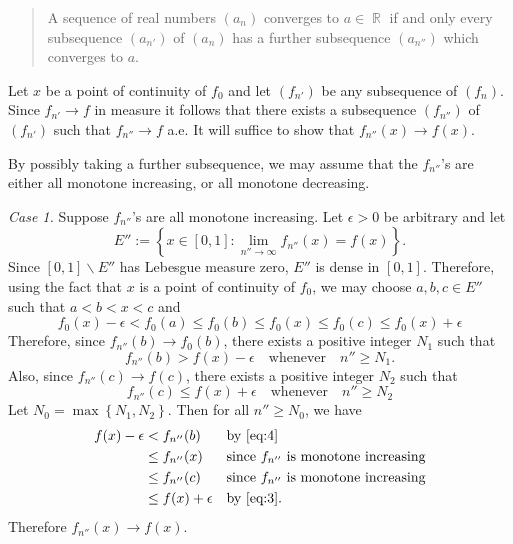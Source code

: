\documentclass[answers]{exam}
\DeclareMathOperator{\RR}{\mathbb{R}}
\begin{document}
\begin{questions}
\begin{solution}
\begin{quote}
  A sequence of real numbers $(a_{n})$ converges
  to $a\in \RR$ if and only every subsequence $(a_{n'})$ of $(a_{n})$ has a
  further subsequence $(a_{n''})$ which converges to $a$.
\end{quote}


Let $x$ be a point of continuity of $f_{0}$ and let $(f_{n'})$ be any
subsequence of $(f_{n})$. Since $f_{n'}\to f$ in measure it follows that there
exists a subsequence $(f_{n''})$ of $(f_{n'})$ such that $f_{n''} \to f$ a.e. It
will suffice to show that $f_{n''}(x)\to f(x)$.

By possibly taking a further subsequence, we may assume that the $f_{n''}$'s are
either all monotone increasing, or all monotone decreasing.


\textit{Case 1.} Suppose $f_{n''}$'s are all monotone increasing. Let
$\epsilon>0$ be arbitrary and let
\begin{equation*}
  E'' := \left\{x\in [0,1] :\lim_{n''\to\infty} f_{n''}(x) = f(x) \right\}.
\end{equation*}
Since $[0,1]\backslash E''$ has Lebesgue measure zero, $E''$ is dense in
$[0,1]$. Therefore, using the fact that $x$ is a point of continuity of $f_{0}$,
we may choose $a,b,c\in E''$ such that $a<b<x<c$ and
\begin{equation}
  \label{eq:11}
  f_{0}(x)-\epsilon
  < f_{0}(a)
  \leq f_{0}(b)
  \leq f_{0}(x)
  \leq f_{0}(c)
  \leq f_{0}(x) + \epsilon
\end{equation}
Therefore, since $f_{n''}(b)\to f_{0}(b)$, there exists a positive integer
$N_{1}$ such that
\begin{equation}
  \label{eq:4}
  f_{n''}(b)> f(x)-\epsilon \quad \text{whenever} \quad n'' \geq N_{1}.
\end{equation}
Also, since $f_{n''}(c)\to f(c)$, there exists a positive integer $N_{2}$ such
that
\begin{equation}
  \label{eq:3}
  f_{n''}(c) \leq  f(x)+ \epsilon \quad \text{whenever} \quad n'' \geq N_{2}
\end{equation}
Let $N_{0}= \max \left\{N_{1},N_{2}\right\}$. Then for all $n'' \geq N_{0}$,  we
have
\begin{align*}
  f(x)-\epsilon
  &< f_{n''}(b)
    &&\text{by \eqref{eq:4}}\\
  &\leq f_{n''}(x)
    &&\text{since $f_{n''}$ is monotone increasing}\\
  &\leq f_{n''}(c)
    &&\text{since $f_{n''}$ is monotone increasing}\\
  &\leq f(x)+\epsilon
    &&\text{by \eqref{eq:3}}.
\end{align*}
Therefore $f_{n''}(x)\to f(x)$.


\end{solution}
\end{questions}
\end{document}
